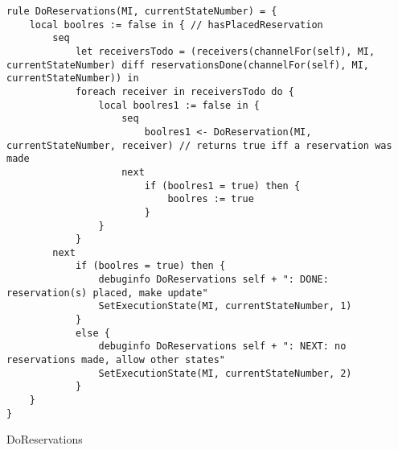 \begin{listing}[H]
\begin{verbatim}
rule DoReservations(MI, currentStateNumber) = {
    local boolres := false in { // hasPlacedReservation
        seq
            let receiversTodo = (receivers(channelFor(self), MI, currentStateNumber) diff reservationsDone(channelFor(self), MI, currentStateNumber)) in
            foreach receiver in receiversTodo do {
                local boolres1 := false in {
                    seq
                        boolres1 <- DoReservation(MI, currentStateNumber, receiver) // returns true iff a reservation was made
                    next
                        if (boolres1 = true) then {
                            boolres := true
                        }
                }
            }
        next
            if (boolres = true) then {
                debuginfo DoReservations self + ": DONE: reservation(s) placed, make update"
                SetExecutionState(MI, currentStateNumber, 1)
            }
            else {
                debuginfo DoReservations self + ": NEXT: no reservations made, allow other states"
                SetExecutionState(MI, currentStateNumber, 2)
            }
    }
}
\end{verbatim}
\caption{DoReservations}
\label{lst:asm:DoReservations}
\end{listing}





